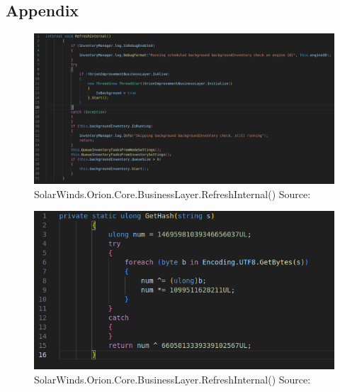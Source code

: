 \documentclass[
	letterpaper, %
	10pt, %
	unnumberedsections, %
	twoside, %
]{LTJournalArticle}
\begin{document}
\clearpage
\begin{appendices}
\onecolumn

\section{Appendix}


\begin{figure}[p] %
	\includegraphics[width=\linewidth]{Figures/RefreshInternal.png}
	\caption{SolarWinds.Orion.Core.BusinessLayer.RefreshInternal() Source:\cite{SolarWindsOrionCoreBusinessLayerdll}}
	\label{fig:RefreshInternal}
\end{figure}

\begin{figure}[p] %
	\includegraphics[width=\linewidth]{Figures/GetHash.png}
   \caption{SolarWinds.Orion.Core.BusinessLayer.RefreshInternal() Source:\cite{SolarWindsOrionCoreBusinessLayerdll}}
	\label{fig:GetHash}
\end{figure}


\begin{landscape}


\end{landscape}
\end{appendices}
\end{document}
